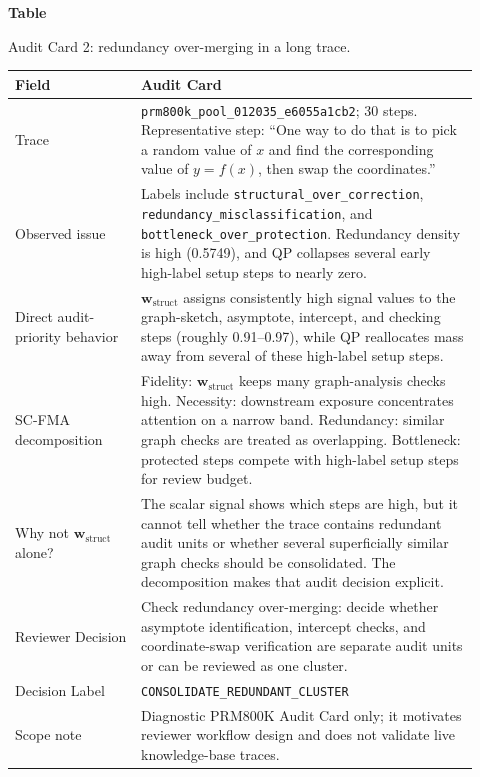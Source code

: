 \documentclass[a4paper,fleqn]{cas-sc}
\newcommand{\wstruct}{\ensuremath{\mathbf{w}_{\mathrm{struct}}}}
\begin{document}
\clearpage
\par\medskip
{}\label{tab:audit-card-redundancy}
\noindent\textbf{Table~\thetable}\par
\noindent Audit Card 2: redundancy over-merging in a long trace.
\begin{center}
\small
\renewcommand{\arraystretch}{1.08}
\begin{tabular}{p{0.25\linewidth}p{0.67\linewidth}}
\toprule
\textbf{Field} & \textbf{Audit Card} \\
\midrule
Trace & \texttt{prm800k\_pool\_012035\_e6055a1cb2}; 30 steps. Representative step: ``One way to do that is to pick a random value of $x$ and find the corresponding value of $y=f(x)$, then swap the coordinates.'' \\
Observed issue & Labels include \texttt{structural\_over\_correction}, \texttt{redundancy\_misclassification}, and \texttt{bottleneck\_over\_protection}. Redundancy density is high (0.5749), and QP collapses several early high-label setup steps to nearly zero. \\
Direct audit-priority behavior & \wstruct{} assigns consistently high signal values to the graph-sketch, asymptote, intercept, and checking steps (roughly 0.91--0.97), while QP reallocates mass away from several of these high-label setup steps. \\
SC-FMA decomposition & Fidelity: \wstruct{} keeps many graph-analysis checks high. Necessity: downstream exposure concentrates attention on a narrow band. Redundancy: similar graph checks are treated as overlapping. Bottleneck: protected steps compete with high-label setup steps for review budget. \\
Why not \wstruct{} alone? & The scalar signal shows which steps are high, but it cannot tell whether the trace contains redundant audit units or whether several superficially similar graph checks should be consolidated. The decomposition makes that audit decision explicit. \\
Reviewer Decision & Check redundancy over-merging: decide whether asymptote identification, intercept checks, and coordinate-swap verification are separate audit units or can be reviewed as one cluster. \\
Decision Label & \texttt{CONSOLIDATE\_REDUNDANT\_CLUSTER} \\
Scope note & Diagnostic PRM800K Audit Card only; it motivates reviewer workflow design and does not validate live knowledge-base traces. \\
\bottomrule
\end{tabular}
\end{center}
\medskip
\end{document}

